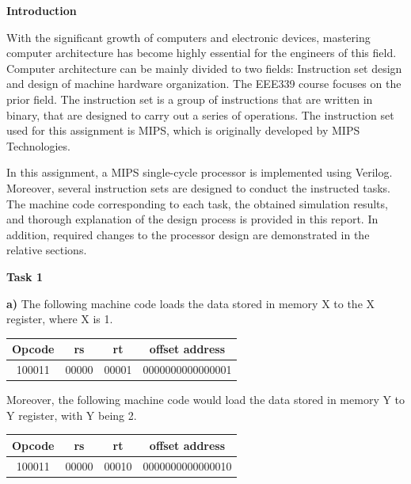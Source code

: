 \documentclass[12pt,a4paper]{article}
\begin{document}
	\noindent \textbf{\Large Introduction}
	\vspace{0.2cm}
	
	\noindent With the significant growth of computers and electronic devices, mastering computer architecture has become highly essential for the engineers of this field. Computer architecture can be mainly divided to two fields: Instruction set design and design of machine hardware organization. The EEE339 course focuses on the prior field. The instruction set is a group of instructions that are written in binary, that are designed to carry out a series of operations. The instruction set used for this assignment is MIPS, which is originally developed by MIPS Technologies.  
	
	\noindent In this assignment, a MIPS single-cycle processor is implemented using Verilog. Moreover, several instruction sets are designed to conduct the instructed tasks. The machine code corresponding to each task, the obtained simulation results, and thorough explanation of the design process is provided in this report. In addition, required changes to the processor design are demonstrated in the relative sections.
	
	\vspace{0.5cm}
	\noindent \textbf{\large Task 1}
	\vspace{0.2cm}
	
	\noindent \textbf{ a)} The following machine code loads the data stored in memory X to the X register, where X is 1.
	
	\begin{table}[H]
		\centering
		\begin{tabular}{|c | c| c| c|}
			\hline
			\textbf{Opcode} & \textbf{rs} & \textbf{rt}& \textbf{offset address}\\ \hline
			100011& 00000 & 00001 & 0000000000000001\\\hline
		\end{tabular}
	\end{table}

	\noindent Moreover, the following machine code would load the data stored in memory Y to Y register, with Y being 2.
	\begin{table}[H]
		\centering
		\begin{tabular}{|c | c| c| c|}
			\hline
			\textbf{Opcode} & \textbf{rs} & \textbf{rt}& \textbf{offset address}\\ \hline
			100011& 00000 & 00010 & 0000000000000010\\\hline
		\end{tabular}
	\end{table}
\end{document}
